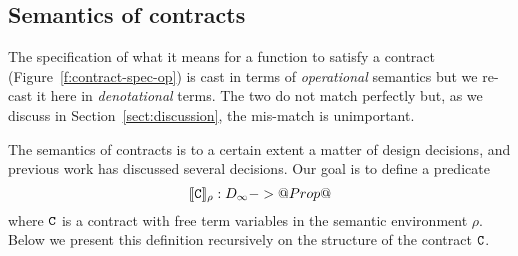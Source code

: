


\subsection{Semantics of contracts}

The specification of what it means for a function to satisfy a
contract (Figure~\ref{f:contract-spec-op}) is cast in terms of
\emph{operational} semantics but we re-cast it here in \emph{denotational} terms.
The two do not match perfectly but, as we discuss in Section~\ref{sect:discussion}, 
the mis-match is unimportant.


The semantics of contracts is to a certain extent a matter of design decisions, and previous
work has discussed several decisions. Our goal is to define a predicate 
\[              [\![{\tt C}]\!]_\rho : D_\infty -> @Prop@   \]
where ${\tt C}$ is a contract with free term variables in the semantic environment $\rho$. Below
we present this definition recursively on the structure of the contract ${\tt C}$.


